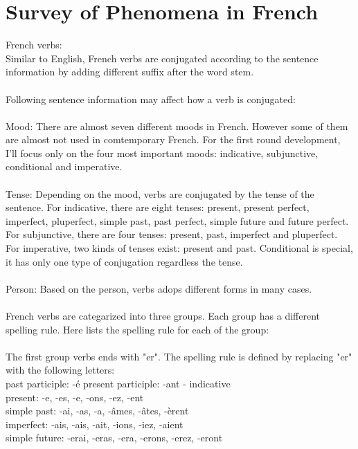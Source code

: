 \documentclass[11pt,letterpaper]{article}
\begin{document}
\section{Survey of Phenomena in French}
French verbs:\\
Similar to English, French verbs are conjugated according to the sentence information by adding different suffix after the word stem.\\
\\
Following sentence information may affect how a verb is conjugated:\\
\\
\indent Mood: There are almost seven different moods in French. However some of them are almost not used in comtemporary French. For the first round development, I'll focus only on the four most important moods: indicative, subjunctive, conditional and imperative.\\
\\
\indent Tense: Depending on the mood, verbs are conjugated by the tense of the sentence. For indicative, there are eight tenses: present, present perfect, imperfect, pluperfect, simple past, past perfect, simple future and future perfect. For subjunctive, there are four tenses: present, past, imperfect and pluperfect. For imperative, two kinds of tenses exist: present and past. Conditional is special, it has only one type of conjugation regardless the tense.\\
\\
\indent Person: Based on the person, verbs adops different forms in many cases.\\
\\
French verbs are categarized into three groups. Each group has a different spelling rule. Here lists the spelling rule for each of the group:\\
\\
\indent The first group verbs ends with "er". The spelling rule is defined by replacing "er" with the following letters:\\
\indent past participle: -\'e
\indent present participle: -ant
\indent - indicative\\
\indent\indent present: -e, -es, -e, -ons, -ez, -ent\\
\indent\indent simple past: -ai, -as, -a, -\^ames, -\^ates, -\`erent\\
\indent\indent imperfect: -ais, -ais, -ait, -ions, -iez, -aient\\
\indent\indent simple future: -erai, -eras, -era, -erons, -erez, -eront\\
\end{document}
